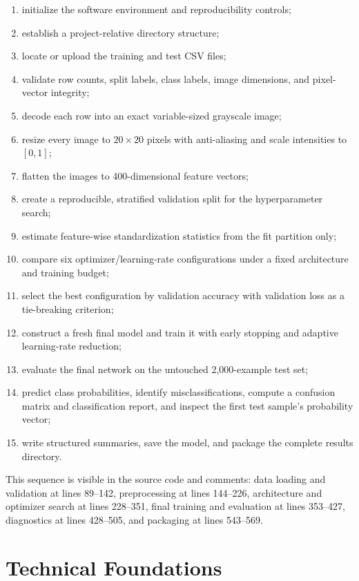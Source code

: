 \documentclass[11pt,a4paper]{article}
\begin{document}
\begin{enumerate}
\item initialize the software environment and reproducibility controls;
\item establish a project-relative directory structure;
\item locate or upload the training and test CSV files;
\item validate row counts, split labels, class labels, image dimensions, and pixel-vector integrity;
\item decode each row into an exact variable-sized grayscale image;
\item resize every image to $20\times20$ pixels with anti-aliasing and scale intensities to $[0,1]$;
\item flatten the images to 400-dimensional feature vectors;
\item create a reproducible, stratified validation split for the hyperparameter search;
\item estimate feature-wise standardization statistics from the fit partition only;
\item compare six optimizer/learning-rate configurations under a fixed architecture and training budget;
\item select the best configuration by validation accuracy with validation loss as a tie-breaking criterion;
\item construct a fresh final model and train it with early stopping and adaptive learning-rate reduction;
\item evaluate the final network on the untouched 2,000-example test set;
\item predict class probabilities, identify misclassifications, compute a confusion matrix and classification report, and inspect the first test sample's probability vector;
\item write structured summaries, save the model, and package the complete results directory.
\end{enumerate}

This sequence is visible in the source code and comments: data loading and validation at lines 89--142, preprocessing at lines 144--226, architecture and optimizer search at lines 228--351, final training and evaluation at lines 353--427, diagnostics at lines 428--505, and packaging at lines 543--569.

\section{Technical Foundations}
\end{document}
